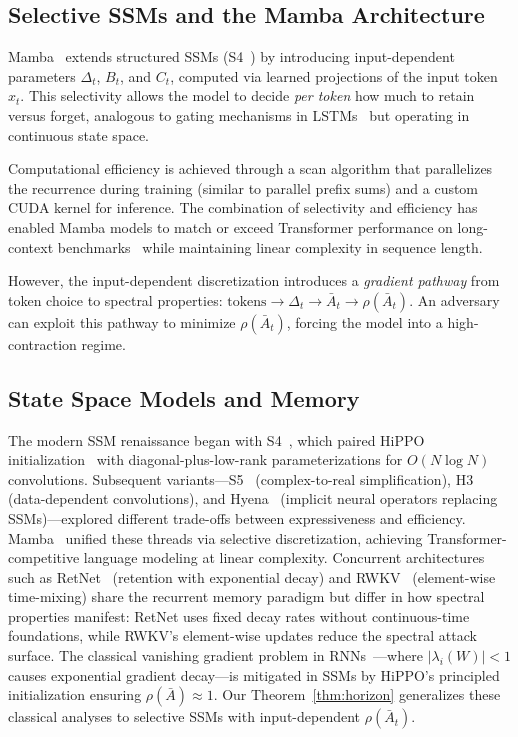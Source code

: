 \documentclass[10pt,twocolumn]{article}
\begin{document}
\subsection{Selective SSMs and the Mamba Architecture}

Mamba~\cite{gu2023mamba} extends structured SSMs (S4~\cite{gu2021efficiently}) by introducing input-dependent parameters $\Delta_t$, $B_t$, and $C_t$, computed via learned projections of the input token $x_t$. This selectivity allows the model to decide \emph{per token} how much to retain versus forget, analogous to gating mechanisms in LSTMs~\cite{hochreiter1997lstm} but operating in continuous state space.

Computational efficiency is achieved through a scan algorithm that parallelizes the recurrence during training (similar to parallel prefix sums) and a custom CUDA kernel for inference. The combination of selectivity and efficiency has enabled Mamba models to match or exceed Transformer performance on long-context benchmarks~\cite{poli2023hyena,dao2022hungry} while maintaining linear complexity in sequence length.

However, the input-dependent discretization introduces a \emph{gradient pathway} from token choice to spectral properties: $\text{tokens} \to \Delta_t \to \bar{A}_t \to \rho(\bar{A}_t)$. An adversary can exploit this pathway to minimize $\rho(\bar{A}_t)$, forcing the model into a high-contraction regime.

\subsection{State Space Models and Memory}

The modern SSM renaissance began with S4~\cite{gu2021efficiently}, which paired HiPPO initialization~\cite{gu2020hippo} with diagonal-plus-low-rank parameterizations for $O(N\log N)$ convolutions. Subsequent variants---S5~\cite{smith2023s5} (complex-to-real simplification), H3~\cite{dao2022hungry} (data-dependent convolutions), and Hyena~\cite{poli2023hyena} (implicit neural operators replacing SSMs)---explored different trade-offs between expressiveness and efficiency. Mamba~\cite{gu2023mamba} unified these threads via selective discretization, achieving Transformer-competitive language modeling at linear complexity. Concurrent architectures such as RetNet~\cite{sun2023retentive} (retention with exponential decay) and RWKV~\cite{peng2023rwkv} (element-wise time-mixing) share the recurrent memory paradigm but differ in how spectral properties manifest: RetNet uses fixed decay rates without continuous-time foundations, while RWKV's element-wise updates reduce the spectral attack surface. The classical vanishing gradient problem in RNNs~\cite{bengio1994learning,hochreiter1997lstm}---where $|\lambda_i(W)|<1$ causes exponential gradient decay---is mitigated in SSMs by HiPPO's principled initialization ensuring $\rho(\bar{A})\approx 1$. Our Theorem~\ref{thm:horizon} generalizes these classical analyses to selective SSMs with input-dependent $\rho(\bar{A}_t)$.
\end{document}
